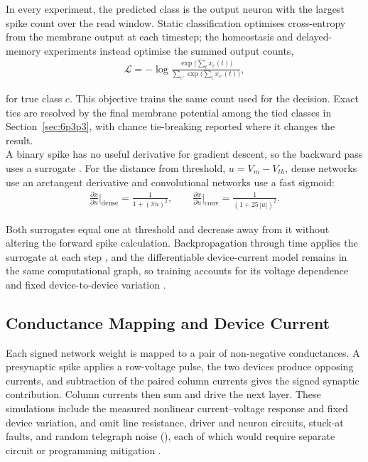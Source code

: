 \noindent In every experiment, the predicted class is the output neuron with the largest spike count over the read
window. Static classification optimises cross-entropy from the membrane output at each timestep; the homeostasis and
delayed-memory experiments instead optimise the summed output counts,
\begin{align}
    \mathcal{L} = -\log \frac{\exp\!\big(\textstyle\sum_t x_c(t)\big)}
                              {\sum_{c'} \exp\!\big(\textstyle\sum_t x_{c'}(t)\big)},
    \label{eq:6ratece}
\end{align}

\noindent for true class $c$. This objective trains the same count used for the decision. Exact ties are resolved by
the final membrane potential among the tied classes in Section~\ref{sec:6p3p3}, with chance tie-breaking reported
where it changes the result.\\

\noindent A binary spike has no useful derivative for gradient descent, so the backward pass uses a surrogate
\cite{neftci2019surrogate, zhou2022memristive, pfeiffer2018deep, wang2020supervised}. For the distance from threshold,
$u=V_m-V_{th}$, dense networks use an arctangent derivative and convolutional networks use a fast sigmoid:
\begin{align}
    \frac{\partial x}{\partial u}\bigg|_{\mathrm{dense}} = \frac{1}{1 + (\pi u)^2},
    \qquad
    \frac{\partial x}{\partial u}\bigg|_{\mathrm{conv}} = \frac{1}{(1 + 25\,|u|)^2}.
    \label{eq:6surrogate}
\end{align}

\noindent Both surrogates equal one at threshold and decrease away from it without altering the forward spike
calculation. Backpropagation through time applies the surrogate at each step
\cite{werbos1990backpropagation}, and the differentiable device-current model remains in the same computational
graph, so training accounts for its voltage dependence and fixed device-to-device variation
\cite{joksas2022nonideality, rasch2021flexible}.

\subsection[Conductance Mapping and Device Current]{Conductance Mapping and Device
Current}\label{sec:6p1p2}

\noindent Each signed network weight is mapped to a pair of non-negative conductances. A presynaptic spike applies a
row-voltage pulse, the two devices produce opposing currents, and subtraction of the paired column currents gives the
signed synaptic contribution. Column currents then sum and drive the next  layer. These simulations
include the measured nonlinear current--voltage response and fixed device variation, and omit line resistance, driver
and neuron circuits, stuck-at faults, and random telegraph noise (), each of which would require
separate circuit or programming mitigation
\cite{ambrogio2018equivalent, li2018analogue, xia2017stuck, chen2017accelerator,
jain2019cxdnn, wang2020ssm, li2019build}.\\

